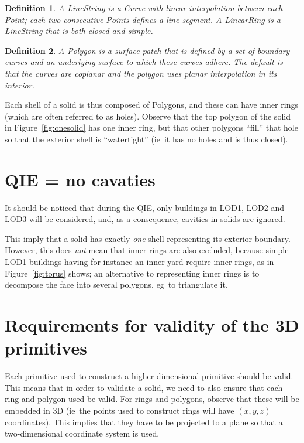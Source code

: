 \documentclass[a4paper,parskip=half,11pt]{scrartcl}
\newcommand{\ie}{ie}
\newcommand{\eg}{eg}
\newtheorem{definition}{Definition}
\begin{document}
\begin{definition}
A LineString is a Curve with linear interpolation between each Point; each two consecutive Points defines a line segment.
A LinearRing is a LineString that is both closed and simple.
\end{definition}
\begin{definition}
  A Polygon is a surface patch that is defined by a set of boundary curves and an underlying surface to which these curves adhere. 
  The default is that the curves are coplanar and the polygon uses planar interpolation in its interior.
\end{definition}

Each shell of a solid is thus composed of Polygons, and these can have inner rings (which are often referred to as holes).
Observe that the top polygon of the solid in Figure~\ref{fig:onesolid} has one inner ring, but that other polygons ``fill'' that hole so that the exterior shell is ``watertight'' (\ie\ it has no holes and is thus closed).


%
\section{QIE = no cavaties}

It should be noticed that during the QIE, only buildings in LOD1, LOD2 and LOD3 will be considered, and, as a consequence, cavities in solids are ignored.

This imply that a solid has exactly \emph{one} shell representing its exterior boundary.
However, this does \emph{not} mean that inner rings are also excluded, because simple LOD1 buildings having for instance an inner yard require inner rings, as in Figure~\ref{fig:torus} shows; an alternative to representing inner rings is to decompose the face into several polygons, \eg\ to triangulate it.


%
\section{Requirements for validity of the 3D primitives}

Each primitive used to construct a higher-dimensional primitive should be valid.
This means that in order to validate a solid, we need to also ensure that each ring and polygon used be valid.
For rings and polygons, observe that these will be embedded in 3D (\ie\ the points used to construct rings will have $(x,y,z)$ coordinates).
This implies that they have to be projected to a plane so that a two-dimensional coordinate system is used.
\end{document}
